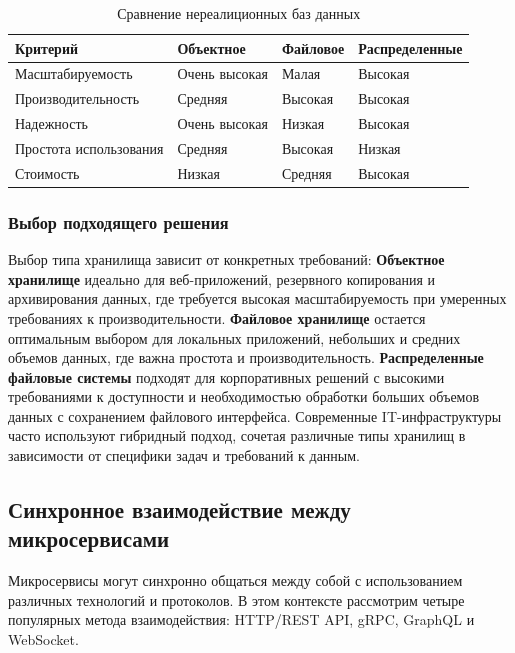 \begin{table}[H]
\centering
\caption{Сравнение нереалиционных баз данных}
\begin{tabular}{|l|l|l|l|}
\hline
\textbf{Критерий}       & \textbf{Объектное}            & \textbf{Файловое}             & \textbf{Распределенные} \\ \hline
Масштабируемость        & Очень высокая                 & Малая                         & Высокая \\ \hline
Производительность      & Средняя                       & Высокая                       & Высокая \\ \hline
Надежность              & Очень высокая                 & Низкая                        & Высокая \\ \hline
Простота использования  & Средняя                       & Высокая                       & Низкая \\ \hline
Стоимость               & Низкая                        & Средняя                       & Высокая \\ \hline
\end{tabular}
\end{table}

\subsubsection* {Выбор подходящего решения}
Выбор типа хранилища зависит от конкретных требований:
\textbf{Объектное хранилище} идеально для веб-приложений, резервного копирования и архивирования данных, где требуется высокая масштабируемость при умеренных требованиях к производительности.
\textbf{Файловое хранилище} остается оптимальным выбором для локальных приложений, небольших и средних объемов данных, где важна простота и производительность.
\textbf{Распределенные файловые системы} подходят для корпоративных решений с высокими требованиями к доступности и необходимостью обработки больших объемов данных с сохранением файлового интерфейса.
Современные IT-инфраструктуры часто используют гибридный подход, сочетая различные типы хранилищ в зависимости от специфики задач и требований к данным.

\subsection{Синхронное взаимодействие между микросервисами}

Микросервисы могут синхронно общаться между собой с использованием различных технологий и протоколов. 
В этом контексте рассмотрим четыре популярных метода взаимодействия: HTTP/REST API, gRPC, GraphQL и WebSocket.

